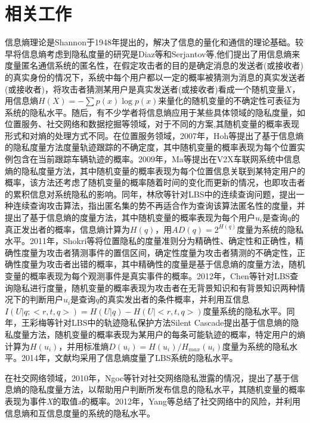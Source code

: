 \section{相关工作}\label{related work}

信息熵理论是Shannon于1948年提出的，解决了信息的量化和通信的理论基础。较早将信息熵考虑到隐私度量的研究是Diaz等\cite{diaz2002towards}和Serjantov等\cite{serjantov2002towards},他们提出了用信息熵来度量匿名通信系统的匿名性，在假定攻击者的目的是确定消息的发送者(或接收者)的真实身份的情况下，系统中每个用户都以一定的概率被猜测为消息的真实发送者(或接收者)，将攻击者猜测某用户是真实发送者(或接收者)看成一个随机变量$X$，用信息熵$H(X)=-\sum p(x)\log p(x)$来量化的随机变量的不确定性可表征为系统的隐私水平。随后，有不少学者将信息熵应用于某些具体领域的隐私度量，如位置服务、社交网络和数据挖掘等领域，对于不同的方案\cite{serjantov2002towards,shokri2011quantifying,wang2012location},其随机变量的概率表现形式和对熵的处理方式不同。在位置服务领域，2007年，Hoh等\cite{hoh2007preserving}提出了基于信息熵的隐私度量方法度量轨迹跟踪的不确定度，其中随机变量的概率表现为每个位置实例包含在当前跟踪车辆轨迹的概率。2009年，Ma等\cite{ma2009measuring}提出在V2X车联网系统中信息熵的隐私度量方法，其中随机变量的概率表现为每个位置信息关联到某特定用户的概率，该方法还考虑了随机变量的概率随着时间的变化而更新的情况，也即攻击者的累积信息对系统隐私的影响。同年，林欣等\cite{lin2009lbs}针对LBS中的连续查询问题，提出一种连续查询攻击算法，指出匿名集的势不再适合作为查询该算法匿名性的度量，并提出了基于信息熵的度量方法，其中随机变量的概率表现为每个用户$u_{i}$是查询$q$的真正发出者的概率，信息熵计算为$H(q)$，用$AD(q)=2^{H(q)}$度量为系统的隐私水平。2011年，Shokri等\cite{shokri2011quantifying}将位置隐私的度量准则分为精确性、确定性和正确性，精确性度量为攻击者猜测事件的置信区间，确定性度量为攻击者猜测的不确定性，正确性度量为攻击者出错的概率，其中精确性的度量是基于信息熵的度量方法，随机变量的概率表现为每个观测事件是真实事件的概率。2012年，Chen等\cite{chen2012measuring}针对LBS查询隐私进行度量，随机变量的概率表现为攻击者在无背景知识和有背景知识两种情况下的判断用户$u_{i}$是查询$q$的真实发出者的条件概率，并利用互信息$I(U|q;<r,t,q>)=H(U|q)-H(U|<r,t,q>)$度量系统的隐私水平。同年，王彩梅\cite{wang2012location}等针对LBS中的轨迹隐私保护方法Silent Cascade提出基于信息熵的隐私度量方法，随机变量的概率表现为某用户的每条可能轨迹的概率，特定用户的熵计算为$H(u_{i})$，并用标准熵$D(u_{i})=H(u_{i})/H_{max}(u_{i})$度量为系统的隐私水平。2014年，文献\cite{niu2014achieving,olteanu2017quantifying}均采用了信息熵度量了LBS系统的隐私水平。

在社交网络领域，2010年，Ngoc等\cite{ngoc2010new}针对社交网络隐私泄露的情况，提出了基于信息熵的隐私度量方法，以帮助用户判断所发布信息的隐私水平，其随机变量的概率表现为事件\textit{X}的取值\textit{x}的概率。2012年，Yang等\cite{yang2012stalking}总结了社交网络中的风险，并利用信息熵和互信息度量的系统的隐私水平。

